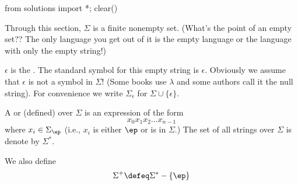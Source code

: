 \begin{python0}
from solutions import *; clear()
\end{python0}

Through this section, $\Sigma$ is a finite nonempty set. (What's
the point of an empty set?? The only language you get out of it is
the empty language or the language with only the empty string!)

\begin{defn}
$\epsilon$ is the . The standard symbol for
this empty string is $\epsilon$. Obviously we assume that $\epsilon$
is not a symbol in $\Sigma$! (Some books use $\lambda$ and some
authors call it the null string). For convenience we write
$\Sigma_\epsilon$ for $\Sigma \cup \{\epsilon\}$.
\end{defn}

\begin{defn}
  A
  or
  \sidebarskip{12pt}
  (defined) over $\Sigma$ is an expression of the form
  \[
  x_0 x_1 x_2 \ldots x_{n-1}
  \]
  where $x_i \in \Sigma_\ep$ (i.e., $x_i$ is either $\ep$ or is in
  $\Sigma$.)
  The set of all strings over $\Sigma$
  is denote by $\Sigma^*$.
\end{defn}

\begin{defn}
We also define
\[
 \Sigma^+ \defeq \Sigma^* - \{ \ep \}
\]
\end{defn}
